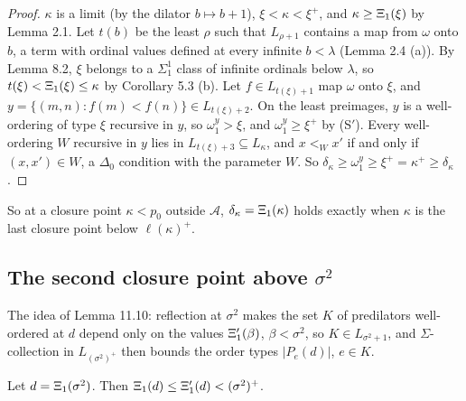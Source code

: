 \documentclass[11pt]{article}
\begin{document}
\begin{proof} $\kappa$ is a limit (by the dilator $b \mapsto b + 1$), $\xi < \kappa < \xi^+$, and
$\kappa \ge \Xi_1(\xi)$ by Lemma 2.1. Let $t(b)$ be the least $\rho$ such that
$L_{\rho + 1}$ contains a map from $\omega$ onto $b$, a term with ordinal values defined at every infinite $b < \lambda$
(Lemma 2.4 (a)). By Lemma 8.2, $\xi$ belongs to a $\Sigma^1_1$ class of infinite ordinals below $\lambda$, so
$t(\xi) < \Xi_1(\xi) \le \kappa$ by Corollary 5.3 (b). Let $f \in L_{t(\xi) + 1}$ map $\omega$ onto $\xi$, and
$y = \{(m, n) : f(m) < f(n)\} \in L_{t(\xi) + 2}$. On the least preimages, $y$ is a well-ordering of type $\xi$
recursive in $y$, so $\omega_1^y > \xi$, and $\omega_1^y \ge \xi^+$ by (S$'$). Every well-ordering $W$ recursive in
$y$ lies in $L_{t(\xi) + 3} \subseteq L_{\kappa}$, and $x <_W x'$ if and only if $(x, x') \in W$, a $\Delta_0$
condition with the parameter $W$. So $\delta_{\kappa} \ge \omega_1^y \ge \xi^+ = \kappa^+ \ge \delta_{\kappa}$.
\end{proof}

So at a closure point $\kappa < p_0$ outside $\mathcal A$, $\delta_{\kappa} = \Xi_1(\kappa)$ holds exactly when
$\kappa$ is the last closure point below $\ell(\kappa)^+$.

\subsection{The second closure point above \texorpdfstring{$\sigma^2$}{sigma-squared}}

The idea of Lemma 11.10: reflection at $\sigma^2$ makes the set $K$ of predilators well-ordered at $d$ depend only on
the values $\Xi'_1(\beta)$, $\beta < \sigma^2$, so $K \in L_{\sigma^2 + 1}$, and $\Sigma$-collection in
$L_{(\sigma^2)^+}$ then bounds the order types $|P_e(d)|$, $e \in K$.

\begin{statement} Let $d = \Xi_1(\sigma^2)$. Then $\Xi_1(d) \le \Xi'_1(d) < (\sigma^2)^+$.
\end{statement}
\end{document}
